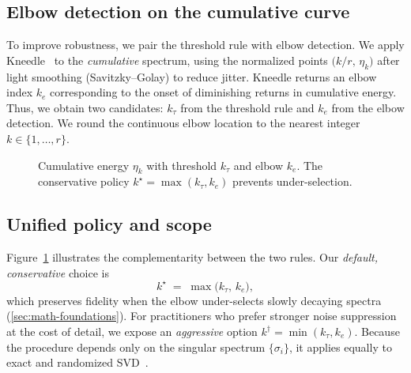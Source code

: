 \documentclass[11pt,a4paper]{article}
\begin{document}
\subsection{Elbow detection on the cumulative curve}
To improve robustness, we pair the threshold rule with elbow detection. 
We apply Kneedle~\cite{satopaa2011kneedle} to the \emph{cumulative} spectrum, using the normalized points \(\bigl(k/r,\,\eta_k\bigr)\) after light smoothing (Savitzky--Golay) to reduce jitter. 
Kneedle returns an elbow index \(k_e\) corresponding to the onset of diminishing returns in cumulative energy. 
Thus, we obtain two candidates: \(k_\tau\) from the threshold rule and \(k_e\) from the elbow detection.
We round the continuous elbow location to the nearest integer \(k\in\{1,\dots,r\}\).

\begin{figure}[t]
\centering
{}
\caption{Cumulative energy $\eta_k$ with threshold $k_\tau$ and elbow $k_e$. 
The conservative policy $k^\star = \max(k_\tau, k_e)$ prevents under-selection.}
\label{fig:adaptive_rank}
\end{figure}

\subsection{Unified policy and scope}
Figure~\ref{fig:adaptive_rank} illustrates the complementarity between the two rules. 
Our \emph{default, conservative} choice is
\[
k^\star \;=\; \max\!\bigl(k_\tau,\,k_e\bigr),
\]
which preserves fidelity when the elbow under-selects slowly decaying spectra (\cref{sec:math-foundations}).
For practitioners who prefer stronger noise suppression at the cost of detail, we expose an \emph{aggressive} option \(k^\dagger=\min(k_\tau,k_e)\). 
Because the procedure depends only on the singular spectrum \(\{\sigma_i\}\), it applies equally to exact and randomized SVD~\cite{halko2011finding}. 
\end{document}
